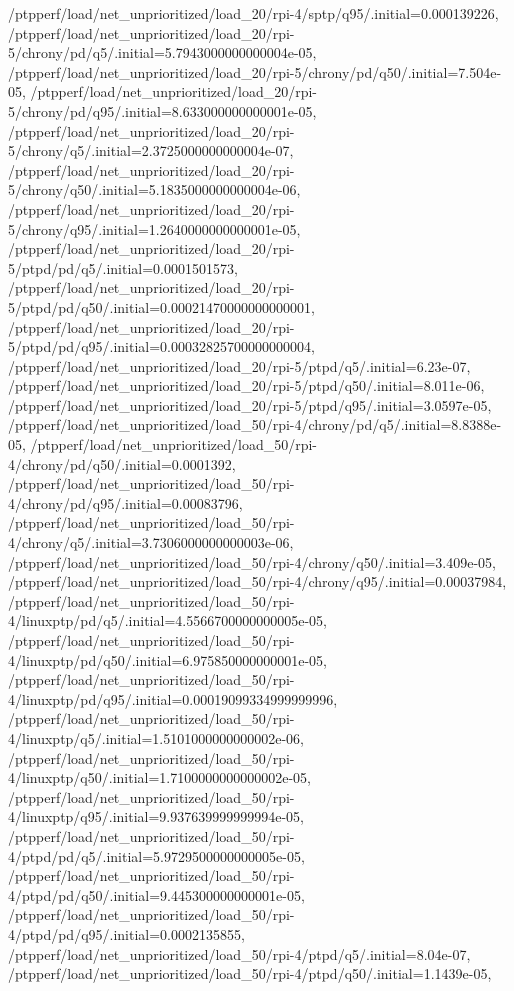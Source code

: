 {    /ptpperf/load/net_unprioritized/load_20/rpi-4/sptp/q95/.initial=0.000139226,
    /ptpperf/load/net_unprioritized/load_20/rpi-5/chrony/pd/q5/.initial=5.7943000000000004e-05,
    /ptpperf/load/net_unprioritized/load_20/rpi-5/chrony/pd/q50/.initial=7.504e-05,
    /ptpperf/load/net_unprioritized/load_20/rpi-5/chrony/pd/q95/.initial=8.633000000000001e-05,
    /ptpperf/load/net_unprioritized/load_20/rpi-5/chrony/q5/.initial=2.3725000000000004e-07,
    /ptpperf/load/net_unprioritized/load_20/rpi-5/chrony/q50/.initial=5.1835000000000004e-06,
    /ptpperf/load/net_unprioritized/load_20/rpi-5/chrony/q95/.initial=1.2640000000000001e-05,
    /ptpperf/load/net_unprioritized/load_20/rpi-5/ptpd/pd/q5/.initial=0.0001501573,
    /ptpperf/load/net_unprioritized/load_20/rpi-5/ptpd/pd/q50/.initial=0.00021470000000000001,
    /ptpperf/load/net_unprioritized/load_20/rpi-5/ptpd/pd/q95/.initial=0.00032825700000000004,
    /ptpperf/load/net_unprioritized/load_20/rpi-5/ptpd/q5/.initial=6.23e-07,
    /ptpperf/load/net_unprioritized/load_20/rpi-5/ptpd/q50/.initial=8.011e-06,
    /ptpperf/load/net_unprioritized/load_20/rpi-5/ptpd/q95/.initial=3.0597e-05,
    /ptpperf/load/net_unprioritized/load_50/rpi-4/chrony/pd/q5/.initial=8.8388e-05,
    /ptpperf/load/net_unprioritized/load_50/rpi-4/chrony/pd/q50/.initial=0.0001392,
    /ptpperf/load/net_unprioritized/load_50/rpi-4/chrony/pd/q95/.initial=0.00083796,
    /ptpperf/load/net_unprioritized/load_50/rpi-4/chrony/q5/.initial=3.7306000000000003e-06,
    /ptpperf/load/net_unprioritized/load_50/rpi-4/chrony/q50/.initial=3.409e-05,
    /ptpperf/load/net_unprioritized/load_50/rpi-4/chrony/q95/.initial=0.00037984,
    /ptpperf/load/net_unprioritized/load_50/rpi-4/linuxptp/pd/q5/.initial=4.5566700000000005e-05,
    /ptpperf/load/net_unprioritized/load_50/rpi-4/linuxptp/pd/q50/.initial=6.975850000000001e-05,
    /ptpperf/load/net_unprioritized/load_50/rpi-4/linuxptp/pd/q95/.initial=0.00019099334999999996,
    /ptpperf/load/net_unprioritized/load_50/rpi-4/linuxptp/q5/.initial=1.5101000000000002e-06,
    /ptpperf/load/net_unprioritized/load_50/rpi-4/linuxptp/q50/.initial=1.7100000000000002e-05,
    /ptpperf/load/net_unprioritized/load_50/rpi-4/linuxptp/q95/.initial=9.937639999999994e-05,
    /ptpperf/load/net_unprioritized/load_50/rpi-4/ptpd/pd/q5/.initial=5.9729500000000005e-05,
    /ptpperf/load/net_unprioritized/load_50/rpi-4/ptpd/pd/q50/.initial=9.445300000000001e-05,
    /ptpperf/load/net_unprioritized/load_50/rpi-4/ptpd/pd/q95/.initial=0.0002135855,
    /ptpperf/load/net_unprioritized/load_50/rpi-4/ptpd/q5/.initial=8.04e-07,
    /ptpperf/load/net_unprioritized/load_50/rpi-4/ptpd/q50/.initial=1.1439e-05,
}
